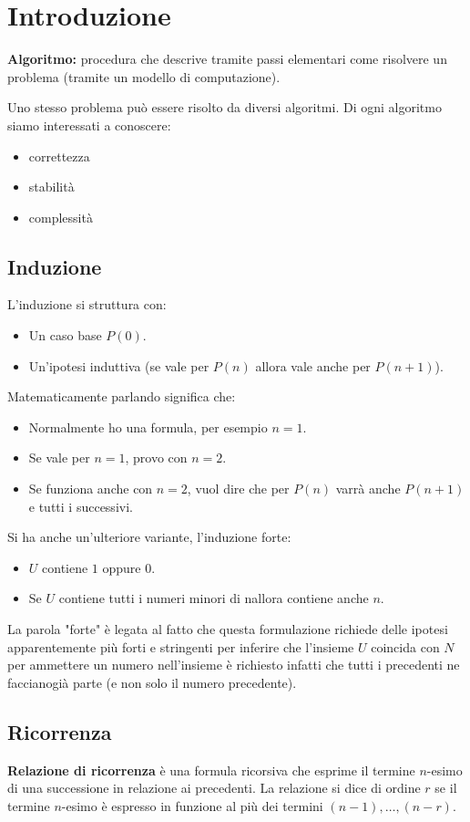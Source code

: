 \section{Introduzione}
\begin{mdframed}
    \textbf{Algoritmo:} procedura che descrive tramite passi elementari come risolvere un problema (tramite un modello di computazione).
\end{mdframed}

\raggedright
Uno stesso problema può essere risolto da diversi algoritmi. Di ogni algoritmo siamo interessati a conoscere:
\begin{itemize}
    \item correttezza
    \item stabilità
    \item complessità
\end{itemize}

\subsection{Induzione}
L'induzione si struttura con:
\begin{itemize}
    \item Un caso base $P(0)$.
    \item Un'ipotesi induttiva (se vale per $P(n)$ allora vale anche per $P(n+1)$).
\end{itemize}

Matematicamente parlando significa che:
\begin{itemize}
    \item Normalmente ho una formula, per esempio $n=1$.
    \item Se vale per $n=1$, provo con $n=2$.
    \item Se funziona anche con $n=2$, vuol dire che per $P(n)$ varrà anche $P(n+1)$ e tutti i successivi.
\end{itemize}

Si ha anche un'ulteriore variante, l'induzione forte:
\begin{itemize}
    \item $U$ contiene $1$ oppure $0$.
    \item Se $U$ contiene tutti i numeri minori di nallora contiene anche $n$.
\end{itemize}

La parola "forte" è legata al fatto che questa formulazione richiede delle ipotesi apparentemente più forti e stringenti per inferire che l'insieme $U$ coincida con $N$ per ammettere un numero nell'insieme è richiesto infatti che tutti i precedenti ne faccianogià parte (e non solo il numero precedente).

\subsection{Ricorrenza}
\begin{mdframed}
    \textbf{Relazione di ricorrenza} è una formula ricorsiva che esprime il termine $n$-esimo di una successione in relazione ai precedenti.
    La relazione si dice di ordine $r$ se il termine $n$-esimo è espresso in funzione al più dei termini $(n - 1), \ldots, (n - r)$.
\end{mdframed}

\newpage